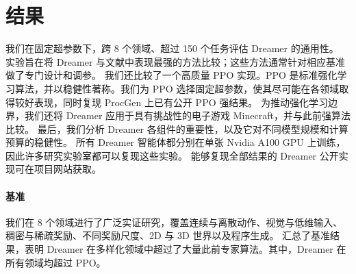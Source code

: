 


\section*{结果}
\label{sec:experiments}

我们在固定超参数下，跨 8 个领域、超过 150 个任务评估 Dreamer 的通用性。
实验旨在将 Dreamer 与文献中表现最强的方法比较；这些方法通常针对相应基准做了专门设计和调参。
我们还比较了一个高质量 PPO\citep{schulman2017ppo} 实现。PPO 是标准强化学习算法，并以稳健性著称。我们为 PPO 选择固定超参数，使其尽可能在各领域取得较好表现，同时复现 ProcGen 上已有公开 PPO 强结果\citep{cobbe2021ppg}。
为推动强化学习边界，我们还将 Dreamer 应用于具有挑战性的电子游戏 Minecraft，并与此前强算法比较。
最后，我们分析 Dreamer 各组件的重要性，以及它对不同模型规模和计算预算的稳健性。
所有 Dreamer 智能体都分别在单张 Nvidia A100 GPU 上训练，因此许多研究实验室都可以复现这些实验。
能够复现全部结果的 Dreamer 公开实现可在项目网站获取。

\paragraph{基准}
我们在 8 个领域进行了广泛实证研究，覆盖连续与离散动作、视觉与低维输入、稠密与稀疏奖励、不同奖励尺度、2D 与 3D 世界以及程序生成。
 汇总了基准结果，表明 Dreamer 在多样化领域中超过了大量此前专家算法。其中，Dreamer 在所有领域均超过 PPO。

